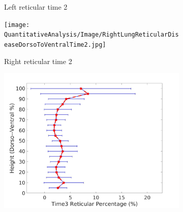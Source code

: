 \begin{figure}[H]
\begin{subfigure}{.41\linewidth}
  \caption{Left reticular time 2}
  \label{fig:DiseaseDorsoToVentralOverTime2-c} 
\end{subfigure} 
\begin{subfigure}{.41\linewidth}%
  \texttt{[image: QuantitativeAnalysis/Image/RightLungReticularDiseaseDorsoToVentralTime2.jpg]}
  \caption{Right reticular time 2}
  \label{fig:DiseaseDorsoToVentralOverTime2-d}
\end{subfigure}
\begin{subfigure}{.41\linewidth}%
  \includegraphics[width=\linewidth,trim={{.0\wd0} {.0\wd0} {.0\wd0} {.0\wd0}},clip]{QuantitativeAnalysis/Image/LeftLungReticularDiseaseDorsoToVentralTime3.jpg} %

\end{subfigure}
\end{figure}
